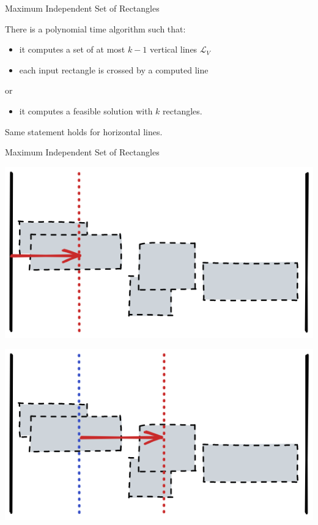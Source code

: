 \documentclass[handout,usenames,dvipsnames]{beamer}
\begin{document}
\begin{frame}{Maximum Independent Set of Rectangles}
    \begin{lm}
        There is a polynomial time algorithm such that: 
        \pause
        \begin{itemize}
            \item it computes a set of at most $k - 1$ vertical lines $\mathcal{L}_V$
            \pause
            \item each input rectangle is crossed by a computed line
        \end{itemize}
        or
        \pause
        \begin{itemize}
        
            \item it computes a feasible solution with $k$ rectangles.
        \end{itemize}
        \pause
        Same statement holds for horizontal lines.
    \end{lm}
\end{frame}

\begin{frame}{Maximum Independent Set of Rectangles}
    \begin{minipage}{0.45\textwidth}
        
        \includegraphics[width=\textwidth]{l1c1.png}
    \end{minipage}\hfill
    \begin{minipage}{0.45\textwidth}
        \begin{center}
            \includegraphics[width=\textwidth]{l1c2.png}
        \end{center}
    \end{minipage}
\end{frame}
\end{document}
